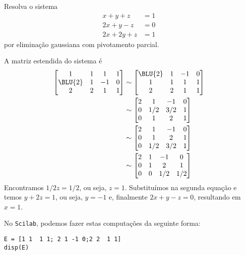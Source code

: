 \begin{ex} Resolva o sistema
\begin{equation}
  \begin{split}
    x+y+z  &= 1\\
    2x+y-z &= 0\\
    2x+2y+z &= 1
  \end{split}
\end{equation}
por eliminação gaussiana com pivotamento parcial.
\end{ex}
\begin{sol}
A matriz estendida do sistema é
\begin{equation}
  \begin{split}
    \begin{bmatrix}
      1 &1&  1&1\\
      \BLU{2} &1& -1&0\\
      2 & 2 &1&1
    \end{bmatrix}
    &\sim
    \begin{bmatrix}
      \BLU{2} &1& -1&0\\
      1 &1&  1&1\\
      2 &2&  1&1
    \end{bmatrix}\\
    &\sim
    \begin{bmatrix}
      2 &1& -1&0\\
      0 &1/2& 3/2&1\\
      0 & 1 &2&1
    \end{bmatrix}\\
    &\sim
    \begin{bmatrix}
      2 &1& -1&0\\
      0 & 1 &2&1\\
      0 &1/2& 3/2&1
    \end{bmatrix}\\
    &\sim
    \begin{bmatrix}
      2 &1& -1&0\\
      0 & 1 &2&1\\
      0 &0& 1/2&1/2
    \end{bmatrix}
  \end{split}
\end{equation}
Encontramos $1/2z=1/2$, ou seja, $z=1$. Substituímos na segunda equação e temos $y+2z=1$, ou seja, $y=-1$ e, finalmente $2x+y-z=0$, resultando em $x=1$.

\ifisscilab
No \verb+Scilab+, podemos fazer estas computações da seguinte forma:
\begin{verbatim}
E = [1 1  1 1; 2 1 -1 0;2 2  1 1]
disp(E)


\end{verbatim}
\end{sol}
